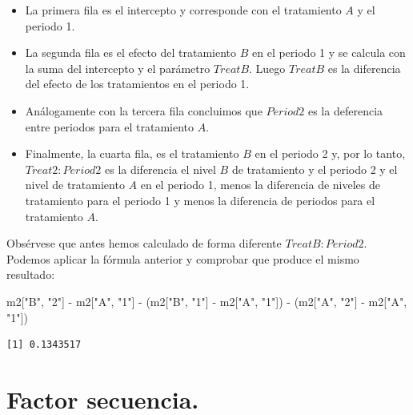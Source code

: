 \documentclass[
  12pt,
  a4paper,
  extrafontsizes,
  onecolumn,
  openright]{memoir}
\newenvironment{Shaded}{\begin{snugshade}}{\end{snugshade}}
\newcommand{\NormalTok}[1]{\textcolor[rgb]{0.00,0.23,0.31}{#1}}
\newcommand{\SpecialCharTok}[1]{\textcolor[rgb]{0.37,0.37,0.37}{#1}}
\newcommand{\StringTok}[1]{\textcolor[rgb]{0.13,0.47,0.30}{#1}}
\providecommand{\tightlist}{%
  \setlength{\itemsep}{0pt}\setlength{\parskip}{0pt}}\usepackage{longtable,booktabs,array}
\begin{document}
\normalsize

\begin{itemize}
\tightlist
\item
  La primera fila es el intercepto y corresponde con el tratamiento
  \(A\) y el periodo 1.
\item
  La segunda fila es el efecto del tratamiento \(B\) en el periodo 1 y
  se calcula con la suma del intercepto y el parámetro \(TreatB\). Luego
  \(TreatB\) es la diferencia del efecto de los tratamientos en el
  periodo 1.
\item
  Análogamente con la tercera fila concluimos que \(Period2\) es la
  deferencia entre periodos para el tratamiento \(A\).
\item
  Finalmente, la cuarta fila, es el tratamiento \(B\) en el periodo 2 y,
  por lo tanto, \(Treat2:Period2\) es la diferencia el nivel \(B\) de
  tratamiento y el periodo 2 y el nivel de tratamiento \(A\) en el
  periodo 1, menos la diferencia de niveles de tratamiento para el
  periodo 1 y menos la diferencia de periodos para el tratamiento \(A\).
\end{itemize}

Obsérvese que antes hemos calculado de forma diferente
\(TreatB:Period2\). Podemos aplicar la fórmula anterior y comprobar que
produce el mismo resultado:

\scriptsize

\begin{Shaded}
\begin{Highlighting}[]
\NormalTok{m2[}\StringTok{"B"}\NormalTok{, }\StringTok{"2"}\NormalTok{] }\SpecialCharTok{{-}}\NormalTok{ m2[}\StringTok{"A"}\NormalTok{, }\StringTok{"1"}\NormalTok{] }\SpecialCharTok{{-}}\NormalTok{ (m2[}\StringTok{"B"}\NormalTok{, }\StringTok{"1"}\NormalTok{] }\SpecialCharTok{{-}}\NormalTok{ m2[}\StringTok{"A"}\NormalTok{, }\StringTok{"1"}\NormalTok{]) }\SpecialCharTok{{-}}\NormalTok{ (m2[}\StringTok{"A"}\NormalTok{, }\StringTok{"2"}\NormalTok{] }\SpecialCharTok{{-}}\NormalTok{ m2[}\StringTok{"A"}\NormalTok{, }\StringTok{"1"}\NormalTok{])}
\end{Highlighting}
\end{Shaded}

\begin{verbatim}
[1] 0.1343517
\end{verbatim}

\normalsize

\hypertarget{factor-secuencia.}{%
\section{Factor secuencia.}\label{factor-secuencia.}}
\end{document}
